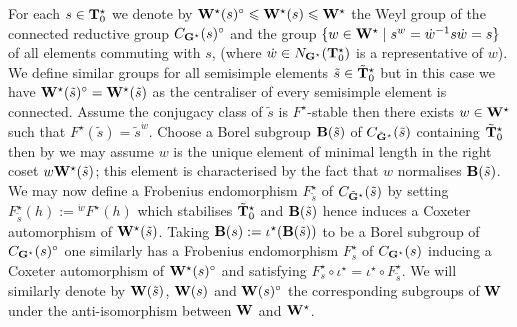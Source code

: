 \documentclass[eqthmnum]{jt-calcs}
\begin{document}
\begin{pa}
For each $s \in \mathbf{T}_0^{\star}$ we denote by $\mathbf{W}^{\star}(s)^{\circ} \leqslant \mathbf{W}^{\star}(s) \leqslant \mathbf{W}^{\star}$ the Weyl group of the connected reductive group $C_{\mathbf{G}^{\star}}(s)^{\circ}$ and the group $\{w \in \mathbf{W}^{\star} \mid s^w = \dot{w}^{-1}s\dot{w} = s\}$ of all elements commuting with $s$, (where $\dot{w} \in N_{\mathbf{G}^{\star}}(\mathbf{T}_0^{\star})$ is a representative of $w$). We define similar groups for all semisimple elements $\tilde{s} \in \tilde{\mathbf{T}}_0^{\star}$ but in this case we have $\mathbf{W}^{\star}(\tilde{s})^{\circ} = \mathbf{W}^{\star}(\tilde{s})$ as the centraliser of every semisimple element is connected. Assume the conjugacy class of $\tilde{s}$ is $F^{\star}$-stable then there exists $w \in \mathbf{W}^{\star}$ such that $F^{\star}(\tilde{s}) = \tilde{s}^{\dot{w}}$. Choose a Borel subgroup $\mathbf{B}(\tilde{s})$ of $C_{\tilde{\mathbf{G}}^{\star}}(\tilde{s})$ containing $\tilde{\mathbf{T}}_0^{\star}$ then by \cite[Lemma 1.9(i)]{lusztig:1984:characters-of-reductive-groups} we may assume $w$ is the unique element of minimal length in the right coset $w\mathbf{W}^{\star}(\tilde{s})$; this element is characterised by the fact that $w$ normalises $\mathbf{B}(\tilde{s})$. We may now define a Frobenius endomorphism $F_{\tilde{s}}^{\star}$ of $C_{\tilde{\mathbf{G}}^{\star}}(\tilde{s})$ by setting $F_{\tilde{s}}^{\star}(h) := {}^{\dot{w}}F^{\star}(h)$ which stabilises $\tilde{\mathbf{T}}_0^{\star}$ and $\mathbf{B}(\tilde{s})$ hence induces a Coxeter automorphism of $\mathbf{W}^{\star}(\tilde{s})$. Taking $\mathbf{B}(s) := \iota^{\star}(\mathbf{B}(\tilde{s}))$ to be a Borel subgroup of $C_{\mathbf{G}^{\star}}(s)^{\circ}$ one similarly has a Frobenius endomorphism $F_s^{\star}$ of $C_{\mathbf{G}^{\star}}(s)$ inducing a Coxeter automorphism of $\mathbf{W}^{\star}(s)^{\circ}$ and satisfying $F_s^{\star}\circ\iota^{\star} = \iota^{\star} \circ F_{\tilde{s}}^{\star}$. We will similarly denote by $\mathbf{W}(\tilde{s})$, $\mathbf{W}(s)$ and $\mathbf{W}(s)^{\circ}$ the corresponding subgroups of $\mathbf{W}$ under the anti-isomorphism between $\mathbf{W}$ and $\mathbf{W}^{\star}$.
\end{pa}
\end{document}
